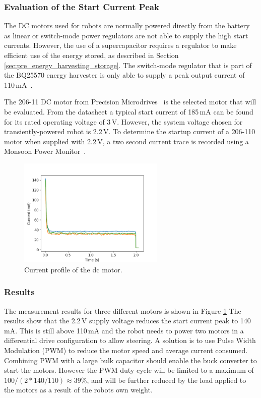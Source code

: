 \subsubsection{Evaluation of the Start Current Peak}
The DC motors used for robots are normally powered directly from the battery as linear or switch-mode power regulators are not able to supply the high start currents.
However, the use of a supercapacitor requires a regulator to make efficient use of the energy stored, as described in Section \ref{sec:pre_energy_harvesting_storage}.
The switch-mode regulator that is part of the BQ25570 energy harvester is only able to supply a peak output current of 110\,mA~\cite{bq25570_2017}.

The 206-11 DC motor from Precision Microdrives~\cite{gearmotor_206-110_2017} is the selected motor that will be evaluated.
From the datasheet a typical start current of 185\,mA can be found for its rated operating voltage of 3\,V.
However, the system voltage chosen for transiently-powered robot is 2.2\,V.
To determine the startup current of a 206-110 motor when supplied with 2.2\,V, a two second current trace is recorded using a Monsoon Power Monitor~\cite{monsoon_powermonitor_2017}.


\begin{figure}%
	\centering
	\includegraphics[width=0.62\textwidth]{pics/free_running_current.png}
	\caption{Current profile of the dc motor.}
	\label{fig:free_running_current}
\end{figure}

\subsubsection{Results}
The measurement results for three different motors is shown in Figure \ref{fig:free_running_current}
The results show that the 2.2\,V supply voltage reduces the start current peak to 140\,mA.
This is still above 110\,mA and the robot needs to power two motors in a differential drive configuration to allow steering.
A solution is to use Pulse Width Modulation (PWM) to reduce the motor speed and average current consumed.
Combining PWM with a large bulk capacitor should enable the buck converter to start the motors.
However the PWM duty cycle will be limited to a maximum of $100/(2*140/110) \approx 39\%$, and will be further reduced by the load applied to the motors as a result of the robots own weight.


